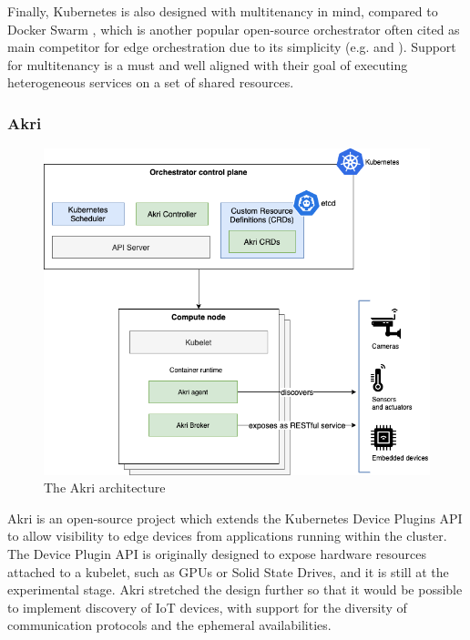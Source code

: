 Finally, Kubernetes is also designed with multitenancy in mind, compared to Docker Swarm \cite{docker-swarm}, which is another popular open-source orchestrator often cited as main competitor for edge orchestration due to its simplicity (e.g. \cite{containers-fog} and \cite{docker-edge-computing}). Support for multitenancy is a must and well aligned with their goal of executing heterogeneous services on a set of shared resources.

\subsubsection{Akri}
\label{sec:akri}

\begin{figure}[h]
\centering
\includegraphics[width=\columnwidth]{figures/akri}
\caption{The Akri architecture \label{fig:akri}}
\end{figure}

Akri \cite{akri} is an open-source project which extends the Kubernetes Device Plugins API \cite{k8s-device-plugins} to allow visibility to edge devices from applications running within the cluster. The Device Plugin API is originally designed to expose hardware resources attached to a kubelet, such as GPUs or Solid State Drives, and it is still at the experimental stage. Akri stretched the design further so that it would be possible to implement discovery of IoT devices, with support for the diversity of communication protocols and the ephemeral availabilities.

